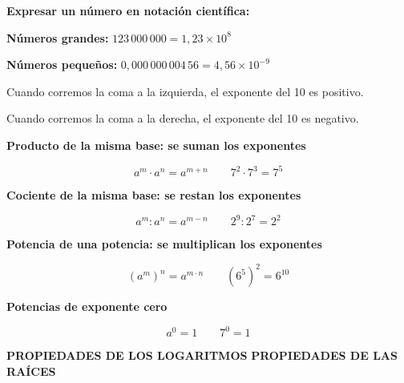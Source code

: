 \documentclass[12pt,a4paper]{article}
\begin{document}
\vspace{0.5cm}

\begin{tcolorbox}[colback=fondoverde,colframe=verdeclaro,title=\textbf{Notación Científica},fonttitle=\bfseries,breakable]

\textbf{Expresar un número en notación científica:}

\textbf{Números grandes:} $123\,000\,000 = 1,23 \times 10^8$

\textbf{Números pequeños:} $0,000\,000\,004\,56 = 4,56 \times 10^{-9}$

\vspace{0.5cm}

Cuando corremos la coma a la izquierda, el exponente del 10 es positivo.

Cuando corremos la coma a la derecha, el exponente del 10 es negativo.

\end{tcolorbox}

\vspace{0.5cm}

\begin{tcolorbox}[colback=fondorosa,colframe=rojoclaro,title=\textbf{Propiedades de las potencias},fonttitle=\bfseries,breakable]

\textbf{Producto de la misma base: se suman los exponentes}

$$a^m \cdot a^n = a^{m+n} \qquad 7^2 \cdot 7^3 = 7^5$$

\textbf{Cociente de la misma base: se restan los exponentes}

$$a^m : a^n = a^{m-n} \qquad 2^9 : 2^7 = 2^2$$

\textbf{Potencia de una potencia: se multiplican los exponentes}

$$(a^m)^n = a^{m \cdot n} \qquad (6^5)^2 = 6^{10}$$

\textbf{Potencias de exponente cero}

$$a^0 = 1 \qquad 7^0 = 1$$

\end{tcolorbox}

\vspace{0.5cm}

\begin{center}
\textbf{PROPIEDADES DE LOS LOGARITMOS} \quad \textbf{PROPIEDADES DE LAS RAÍCES}
\end{center}

\vspace{0.5cm}
\end{document}
